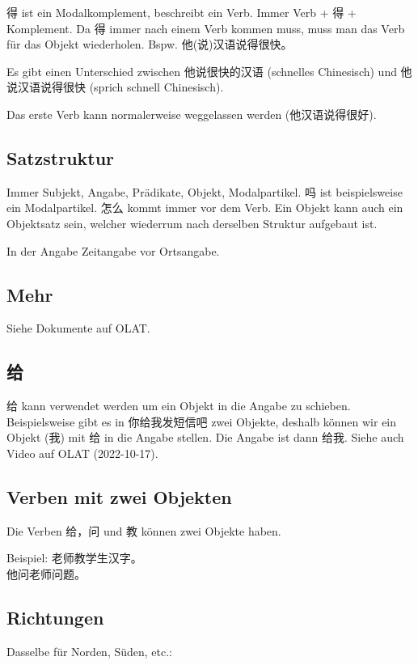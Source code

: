 \documentclass[UTF8]{ctexart}
\begin{document}
得 ist ein Modalkomplement, beschreibt ein Verb. Immer Verb + 得 + Komplement. Da 得 immer nach einem Verb kommen muss, muss man das Verb für das Objekt wiederholen. Bspw. 他(说)汉语说得很快。

Es gibt einen Unterschied zwischen 他说很快的汉语 (schnelles Chinesisch) und 他说汉语说得很快 (sprich schnell Chinesisch).

Das erste Verb kann normalerweise weggelassen werden (他汉语说得很好).

\subsection{Satzstruktur}

Immer Subjekt, Angabe, Prädikate, Objekt, Modalpartikel.
吗 ist beispielsweise ein Modalpartikel. 怎么 kommt immer vor dem Verb. Ein Objekt kann auch ein Objektsatz sein, welcher wiederrum nach derselben Struktur aufgebaut ist.

In der Angabe Zeitangabe vor Ortsangabe.

\subsection{Mehr}

Siehe Dokumente auf OLAT.

\subsection{给}

给 kann verwendet werden um ein Objekt in die Angabe zu schieben. Beispielsweise gibt es in 你给我发短信吧 zwei Objekte, deshalb können wir ein Objekt (我) mit 给 in die Angabe stellen. Die Angabe ist dann 给我. Siehe auch Video auf OLAT (2022-10-17).

\subsection{Verben mit zwei Objekten}

Die Verben 给，问 und 教 können zwei Objekte haben.

Beispiel: 老师教学生汉字。\\
他问老师问题。

\subsection{Richtungen}

Dasselbe für Norden, Süden, etc.:
\end{document}
